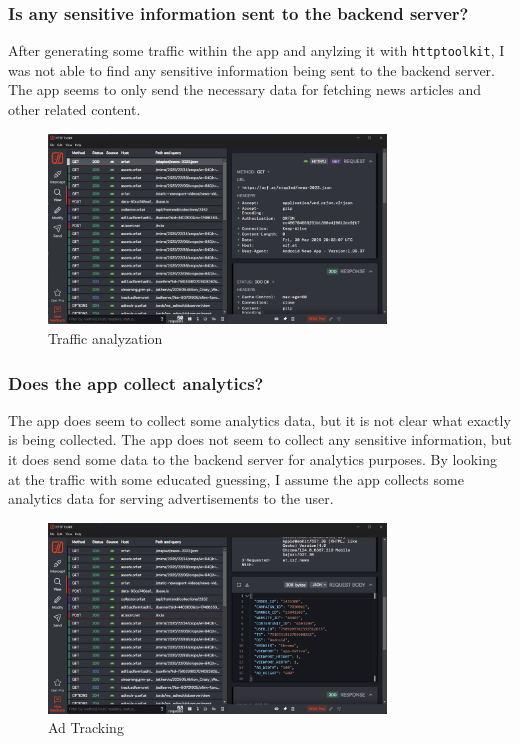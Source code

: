 \documentclass[12pt,a4paper]{article}
\begin{document}
\subsubsection{Is any sensitive information sent to the backend server?}

After generating some traffic within the app and anylzing it with \texttt{httptoolkit}, I was not able to find any sensitive information being sent to the backend server. 
The app seems to only send the necessary data for fetching news articles and other related content.

\begin{figure}[H]
\centering
\includegraphics[width=0.8\textwidth]{./screenshots/Traffic_analyzation.png}
\caption{Traffic analyzation}
\end{figure}

\subsubsection{Does the app collect analytics?}

The app does seem to collect some analytics data, but it is not clear what exactly is being collected. The app does not seem to collect any sensitive information, but it does send some data to the backend server for analytics purposes.
By looking at the traffic with some educated guessing, I assume the app collects some analytics data for serving advertisements to the user.

\begin{figure}[H]
\centering
\includegraphics[width=0.8\textwidth]{./screenshots/ad_tracking.png}
\caption{Ad Tracking}
\end{figure}
\end{document}
